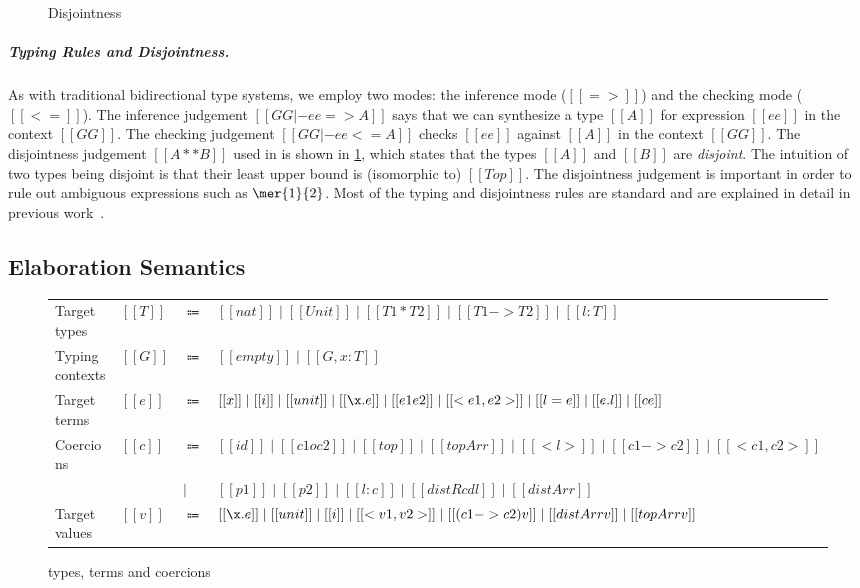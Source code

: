 \begin{figure}[t]
  \centering
  \begin{small}
  \end{small}
  \caption{Disjointness}
  \label{fig:disjoint}
\end{figure}


\subparagraph{Typing Rules and Disjointness.}

As with traditional bidirectional type systems, we employ two modes: the
inference mode ($[[=>]]$) and the checking mode ($[[<=]]$). The inference
judgement $[[GG |- ee => A]]$ says that we can synthesize a type $[[A]]$ for
expression $[[ee]]$ in the context $[[GG]]$. The checking judgement $[[GG |- ee
<= A]]$ checks $[[ee]]$ against $[[A]]$ in the context $[[GG]]$. The
disjointness judgement $[[A ** B]]$ used in  is shown in
\cref{fig:disjoint}, which states that the types $[[A]]$ and $[[B]]$ are
\textit{disjoint}. The intuition of two types being disjoint is
that their least upper bound is (isomorphic to) $[[Top]]$. The disjointness judgement is
important in order to rule out ambiguous expressions such as $\mer{1}{2}$. Most
of the typing and disjointness rules are standard and are explained in detail in
previous work~\cite{oliveira2016disjoint, alpuimdisjoint}.


\subsection{Elaboration Semantics}
\label{sec:elaboration}

\begin{figure}[t]
  \centering
  \begin{small}
\begin{tabular}{llll} \toprule
  Target types & $[[T]]$ & $\Coloneqq$ & $[[nat]] \mid [[Unit]] \mid [[T1 * T2]] \mid [[T1 -> T2]] \mid [[ {l : T} ]]$ \\
  Typing contexts & $[[G]]$ & $\Coloneqq$ & $[[empty]] \mid [[G , x : T]]$ \\
  Target terms & $[[e]]$ & $\Coloneqq$ & $[[x]] \mid [[i]] \mid [[unit]] \mid [[\x . e]] \mid [[e1 e2]] \mid [[<e1, e2>]] \mid [[{ l = e }]] \mid [[e.l]] \mid [[c e]]$ \\
  Coercions & $[[c]]$ & $\Coloneqq$ & $ [[id]] \mid [[c1 o c2]] \mid [[top]] \mid [[topArr]] \mid [[< l >]] \mid [[c1 -> c2]] \mid [[<c1, c2>]]$ \\
  &  &  $\mid$ & $  [[p1]] \mid [[p2]] \mid [[{l : c}]] \mid  [[ distRcd l ]] \mid [[distArr]]  $ \\
  Target values & $[[v]]$ & $\Coloneqq$ & $[[\x.e]] \mid [[unit]] \mid [[i]] \mid [[<v1, v2>]] \mid [[(c1 -> c2) v]] \mid [[distArr v]] \mid [[topArr v]] $ \\ \bottomrule
\end{tabular}
  \end{small}
  \caption{\tname types, terms and coercions}
  \label{fig:target}
\end{figure}

